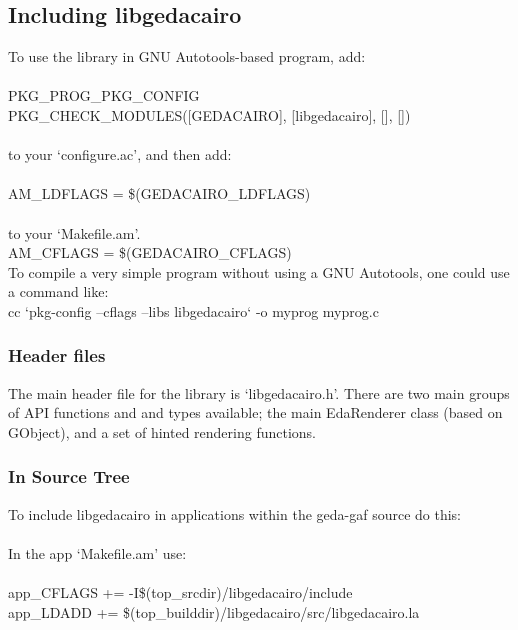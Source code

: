 \subsection*{Including libgedacairo}


  To use the library in GNU Autotools-based program, add: \\ 
\\ 
 PKG\_PROG\_PKG\_CONFIG\\ 
 PKG\_CHECK\_MODULES([GEDACAIRO], [libgedacairo], [], [])\\ 
\\ 
 to your `configure.ac', and then add: \\ 
\\ 
 AM\_LDFLAGS = \$(GEDACAIRO\_LDFLAGS)\\ 
\\ 
 to your `Makefile.am'.\\ 
 AM\_CFLAGS = \$(GEDACAIRO\_CFLAGS)\\



  To compile a very simple program without using a GNU Autotools, one could use a command like:\\ 

cc `pkg-config --cflags --libs libgedacairo` -o myprog myprog.c
\subsubsection*{Header files}
 The main header file for the library is `libgedacairo.h'. There are two main groups of API functions and and types available; the main EdaRenderer class (based on GObject), and a set of hinted rendering functions. 
\subsubsection*{In Source Tree}
 To include libgedacairo in applications within the geda-gaf source do this:\\ 
\\ 
 In the app `Makefile.am' use:\\ 
\\ 
app\_CFLAGS += -I\$(top\_srcdir)/libgedacairo/include
\\ 
app\_LDADD += \$(top\_builddir)/libgedacairo/src/libgedacairo.la


